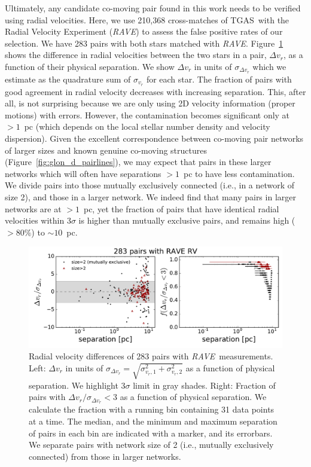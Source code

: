 \documentclass[manuscript, letterpaper]{aastex6}
\newcommand{\project}[1]{\textsl{#1}}
\newcommand{\acronym}[1]{{\small{#1}}}
\newcommand{\rave}{\project{\acronym{RAVE}}}
\newcommand{\tgas}{\acronym{TGAS}}
\begin{document}
Ultimately, any candidate co-moving pair found in this work
needs to be verified using radial velocities.
Here, we use 210,368 cross-matches of \tgas\ with
the Radial Velocity Experiment (\rave) to
assess the false positive rates of our selection.
We have 283 pairs with both stars matched with \rave.
Figure~\ref{fig:raverv} shows the difference in radial velocities
between the two stars in a pair, $\Delta v_r$, as a function of their physical separation.
We show $\Delta v_r$ in units of $\sigma_{\Delta v_r}$ which we estimate
as the quadrature sum of $\sigma _{v_r}$ for each star.
The fraction of pairs with good agreement in radial velocity decreases with
increasing separation.
This, after all, is not surprising because we are only using
2D velocity information (proper motions) with errors.
However, the contamination becomes significant only at $>1$~pc
(which depends on the local stellar number density and velocity dispersion).
Given the excellent correspondence between co-moving pair networks of larger sizes
and known genuine co-moving structures (Figure~\ref{fig:glon_d_pairlines}),
we may expect that pairs in these larger networks which will often have
separations $>1$~pc to have less contamination.
We divide pairs into those mutually exclusively connected (i.e., in a network of
size 2), and those in a larger network.
We indeed find that many pairs in larger networks are at $>1$~pc, yet
the fraction of pairs that have identical radial velocities within $3\sigma$ is
higher than mutually exclusive pairs, and remains high ($>80\%$) to $\sim 10$~pc.

\begin{figure}[htbp]
  \begin{center}
    \includegraphics[width=\textwidth]{figures/raverv.pdf}
  \end{center}
  \caption{%
    Radial velocity differences of 283 pairs with \rave\ measurements.
    Left: $\Delta v_r$ in units of $\sigma_{\Delta v_r} = \sqrt{\sigma_{v_r,1}^2 + \sigma_{v_r,2}^2}$
    as a function of physical separation.
    We highlight $3\sigma$ limit in gray shades.
    Right: Fraction of pairs with $\Delta v_r/\sigma_{\Delta v_r} <3$
    as a function of physical separation. We calculate the fraction with a running
    bin containing 31 data points at a time.
    The median, and the minimum and maximum separation of pairs in each bin are
    indicated with a marker, and its errorbars.
    We separate pairs with network size of 2 (i.e., mutually exclusively connected)
    from those in larger networks.
    \label{fig:raverv}}
\end{figure}
\end{document}
